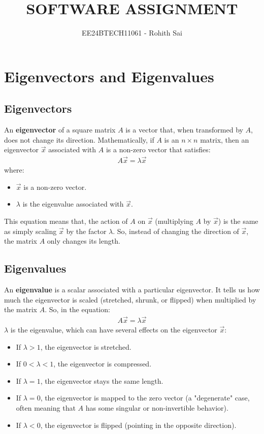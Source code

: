 \documentclass[journal]{IEEEtran}
\begin{document}

\vspace{3cm}

\title{SOFTWARE ASSIGNMENT}
\author{EE24BTECH11061 - Rohith Sai}
\maketitle

\renewcommand{\thefigure}{\theenumi}
\renewcommand{\thetable}{\theenumi}

\section*{\textbf{Eigenvectors and Eigenvalues}}
\subsection*{\textbf{Eigenvectors}}
An \textbf{eigenvector} of a square matrix $A$ is a vector that, when transformed by $A$, does not change its direction. Mathematically, if $A$ is an $n \times n$ matrix, then an eigenvector $\vec{x}$ associated with $A$ is a non-zero vector that satisfies:
\begin{align*}
    A\vec{x} = \lambda \vec{x}
\end{align*}
where:
\begin{itemize}
    \item $\vec{x}$ is a non-zero vector.
    \item $\lambda$ is the eigenvalue associated with $\vec{x}$.
\end{itemize}
This equation means that, the action of $A$ on $\vec{x}$ (multiplying $A$ by $\vec{x}$) is the same as simply scaling $\vec{x}$ by the factor $\lambda$. So, instead of changing the direction of $\vec{x}$, the matrix $A$ only changes its length. 
\subsection*{\textbf{Eigenvalues}}
An \textbf{eigenvalue} is a scalar associated with a particular eigenvector. It tells us how much the eigenvector is scaled (stretched, shrunk, or flipped) when multiplied by the matrix $A$. So, in the equation:
\begin{align*}
    A\vec{x} = \lambda \vec{x}
\end{align*}
$\lambda$ is the eigenvalue, which can have several effects on the eigenvector $\vec{x}$:
\begin{itemize}
    \item If $\lambda > 1$, the eigenvector is stretched.
    \item If $0< \lambda <1$, the eigenvector is compressed.
    \item If $\lambda = 1$, the eigenvector stays the same length.
    \item If $\lambda = 0$, the eigenvector is mapped to the zero vector (a "degenerate" case, often meaning that $A$ has some singular or non-invertible behavior).
    \item If $\lambda < 0$, the eigenvector is flipped (pointing in the opposite direction).
\end{itemize}
\end{document}
